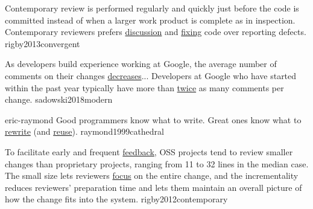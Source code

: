 \documentclass{article}
\begin{document}
  {Contemporary review is performed regularly and quickly just before the code is committed instead of when a larger work product is complete as in inspection. Contemporary reviewers prefers \ul{discussion} and \ul{fixing} code over reporting defects.}
  {rigby2013convergent}

  {As developers build experience working at Google, the average number of comments on their changes \ul{decreases}... Developers at Google who have started within the past year typically have more than \ul{twice} as many comments per change.}
  {sadowski2018modern}



\qte
  {eric-raymond}
  {Good programmers know what to write. Great ones know what to \ul{rewrite} (and \ul{reuse}).}
  {raymond1999cathedral}

  {To facilitate early and frequent \ul{feedback}, OSS projects tend to review smaller changes than proprietary projects, ranging from 11 to 32 lines in the median case. The small size lets reviewers \ul{focus} on the entire change, and the incrementality reduces reviewers’ preparation time and lets them maintain an overall picture of how the change fits into the system.}
  {rigby2012contemporary}
\end{document}
